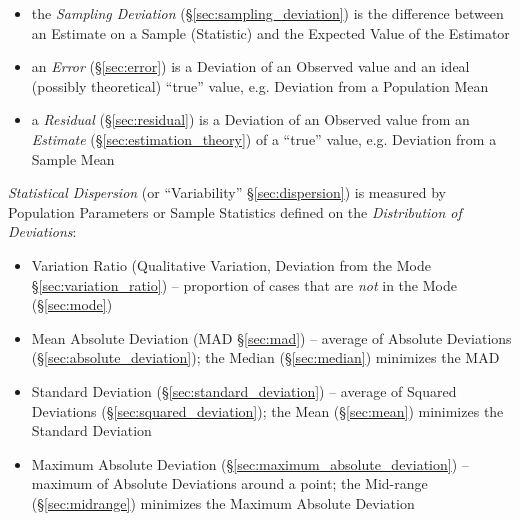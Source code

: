 \begin{itemize}
  \item the \emph{Sampling Deviation} (\S\ref{sec:sampling_deviation}) is the
    difference between an Estimate on a Sample (Statistic) and the Expected
    Value of the Estimator
  \item an \emph{Error} (\S\ref{sec:error}) is a Deviation of an Observed value
    and an ideal (possibly theoretical) ``true'' value, e.g. Deviation from a
    Population Mean
  \item a \emph{Residual} (\S\ref{sec:residual}) is a Deviation of an Observed
    value from an \emph{Estimate} (\S\ref{sec:estimation_theory}) of a ``true''
    value, e.g. Deviation from a Sample Mean
\end{itemize}

\emph{Statistical Dispersion} (or ``Variability'' \S\ref{sec:dispersion}) is
measured by Population Parameters or Sample Statistics defined on the
\emph{Distribution of Deviations}:
\begin{itemize}
  \item Variation Ratio (Qualitative Variation, Deviation from the Mode
    \S\ref{sec:variation_ratio}) -- proportion of cases that are \emph{not} in
    the Mode (\S\ref{sec:mode})
  \item Mean Absolute Deviation (MAD \S\ref{sec:mad}) -- average of Absolute
    Deviations (\S\ref{sec:absolute_deviation}); the Median (\S\ref{sec:median})
    minimizes the MAD
  \item Standard Deviation (\S\ref{sec:standard_deviation}) -- average of
    Squared Deviations (\S\ref{sec:squared_deviation}); the Mean
    (\S\ref{sec:mean}) minimizes the Standard Deviation
  \item Maximum Absolute Deviation (\S\ref{sec:maximum_absolute_deviation}) --
    maximum of Absolute Deviations around a point; the Mid-range
    (\S\ref{sec:midrange}) minimizes the Maximum Absolute Deviation
\end{itemize}

